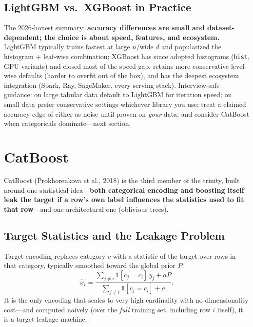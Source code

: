 \subsection{LightGBM vs.\ XGBoost in Practice}

The 2026-honest summary: \textbf{accuracy differences are small and dataset-dependent; the choice is about speed, features, and ecosystem.} LightGBM typically trains fastest at large $n$/wide $d$ and popularized the histogram + leaf-wise combination; XGBoost has since adopted histograms (\texttt{hist}, GPU variants) and closed most of the speed gap, retains more conservative level-wise defaults (harder to overfit out of the box), and has the deepest ecosystem integration (Spark, Ray, SageMaker, every serving stack). Interview-safe guidance: on large tabular data default to LightGBM for iteration speed; on small data prefer conservative settings whichever library you use; treat a claimed accuracy edge of either as noise until proven on \textit{your} data; and consider CatBoost when categoricals dominate---next section.

\section{CatBoost}
\label{cml:sec:catboost}

CatBoost (Prokhorenkova et al., 2018) is the third member of the trinity, built around one statistical idea---\textbf{both categorical encoding and boosting itself leak the target if a row's own label influences the statistics used to fit that row}---and one architectural one (oblivious trees).

\subsection{Target Statistics and the Leakage Problem}

Target encoding replaces category $c$ with a statistic of the target over rows in that category, typically smoothed toward the global prior $P$:
\begin{equation}
\hat{x}_i = \frac{\sum_{j \ne i} \mathds{1}[c_j = c_i]\, y_j + a P}{\sum_{j \ne i} \mathds{1}[c_j = c_i] + a}.
\end{equation}
It is the only encoding that scales to very high cardinality with no dimensionality cost---and computed naively (over the \textit{full} training set, including row $i$ itself), it is a target-leakage machine.

